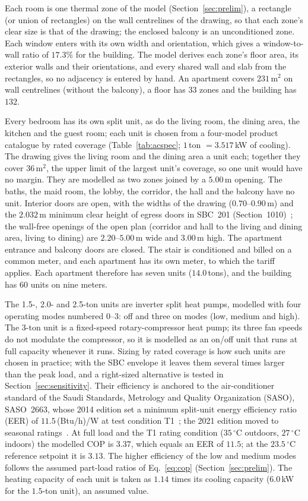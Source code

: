 \documentclass[10pt,a4paper,twocolumn]{article}
\theoremstyle{definition}
\begin{document}
Each room is one thermal zone of the model (Section~\ref{sec:prelim}), a rectangle (or union of rectangles) on the wall centrelines of the drawing, so that each zone's clear size is that of the drawing; the enclosed balcony is an unconditioned zone. Each window enters with its own width and orientation, which gives a window-to-wall ratio of $17.3\%$ for the building. The model derives each zone's floor area, its exterior walls and their orientations, and every shared wall and slab from the rectangles, so no adjacency is entered by hand. An apartment covers $231\,\text{m}^2$ on wall centrelines (without the balcony), a floor has $33$ zones and the building has $132$.

Every bedroom has its own split unit, as do the living room, the dining area, the kitchen and the guest room; each unit is chosen from a four-model product catalogue by rated coverage (Table~\ref{tab:acspec}; $1\,$ton $=3.517\,$kW of cooling). The drawing gives the living room and the dining area a unit each; together they cover $36\,\text{m}^2$, the upper limit of the largest unit's coverage, so one unit would have no margin. They are modelled as two zones joined by a $5.00\,$m opening. The baths, the maid room, the lobby, the corridor, the hall and the balcony have no unit. Interior doors are open, with the widths of the drawing ($0.70$--$0.90\,$m) and the $2.032\,$m minimum clear height of egress doors in SBC~201 (Section~1010)~\citep{sbc201_2018}; the wall-free openings of the open plan (corridor and hall to the living and dining area, living to dining) are $2.20$--$5.00\,$m wide and $3.00\,$m high. The apartment entrance and balcony doors are closed. The stair is conditioned and billed on a common meter, and each apartment has its own meter, to which the tariff applies. Each apartment therefore has seven units ($14.0\,$tons), and the building has $60$ units on nine meters.

The 1.5-, 2.0- and 2.5-ton units are inverter split heat pumps, modelled with four operating modes numbered $0$--$3$: off and three on modes (low, medium and high). The 3-ton unit is a fixed-speed rotary-compressor heat pump; its three fan speeds do not modulate the compressor, so it is modelled as an on/off unit that runs at full capacity whenever it runs. Sizing by rated coverage is how such units are chosen in practice; with the SBC envelope it leaves them several times larger than the peak load, and a right-sized alternative is tested in Section~\ref{sec:sensitivity}. Their efficiency is anchored to the air-conditioner standard of the Saudi Standards, Metrology and Quality Organization (SASO), SASO~2663, whose 2014 edition set a minimum split-unit energy efficiency ratio (EER) of $11.5\,$(Btu/h)/W at test condition T1~\citep{saso2663_2014}; the 2021 edition moved to seasonal ratings~\citep{saso2663}. At full load and the T1 rating condition ($35\,^{\circ}$C outdoors, $27\,^{\circ}$C indoors) the modelled COP is $3.37$, which equals an EER of $11.5$; at the $23.5\,^{\circ}$C reference setpoint it is $3.13$. The higher efficiency of the low and medium modes follows the assumed part-load ratios of Eq.~\eqref{eq:cop} (Section~\ref{sec:prelim}). The heating capacity of each unit is taken as $1.14$ times its cooling capacity ($6.0\,$kW for the $1.5$-ton unit), an assumed value.
\end{document}
